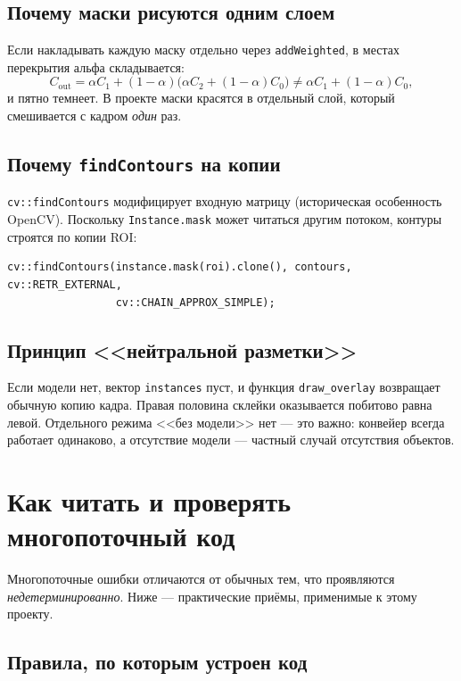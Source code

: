 \documentclass[11pt,a4paper]{article}
\theoremstyle{definition}
\theoremstyle{remark}
\begin{document}
\subsection{Почему маски рисуются одним слоем}

Если накладывать каждую маску отдельно через \texttt{addWeighted}, в местах
перекрытия альфа складывается:
\[
  C_{\text{out}} = \alpha C_1 + (1-\alpha)\bigl(\alpha C_2 + (1-\alpha) C_0\bigr)
  \neq \alpha C_1 + (1-\alpha) C_0 ,
\]
и пятно темнеет. В проекте маски красятся в отдельный слой, который
смешивается с кадром \emph{один} раз.

\subsection{Почему \texttt{findContours} на копии}

\texttt{cv::findContours} модифицирует входную матрицу (историческая
особенность OpenCV). Поскольку \texttt{Instance.mask} может читаться другим
потоком, контуры строятся по копии ROI:

\begin{lstlisting}
cv::findContours(instance.mask(roi).clone(), contours, cv::RETR_EXTERNAL,
                 cv::CHAIN_APPROX_SIMPLE);
\end{lstlisting}

\subsection{Принцип <<нейтральной разметки>>}

Если модели нет, вектор \texttt{instances} пуст, и функция \texttt{draw\_overlay}
возвращает обычную копию кадра. Правая половина склейки оказывается
побитово равна левой. Отдельного режима <<без модели>> нет --- это важно:
конвейер всегда работает одинаково, а отсутствие модели --- частный случай
отсутствия объектов.

\section{Как читать и проверять многопоточный код}

Многопоточные ошибки отличаются от обычных тем, что проявляются
\emph{недетерминированно}. Ниже --- практические приёмы, применимые к этому
проекту.

\subsection{Правила, по которым устроен код}
\end{document}

